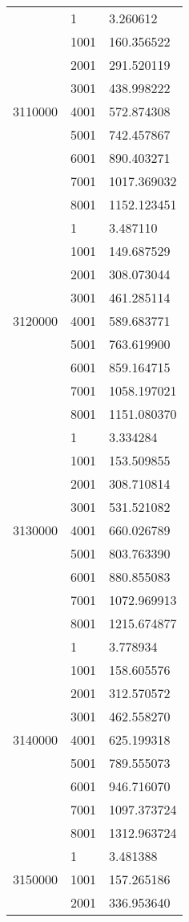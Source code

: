 \begin{table}[htb!]
\begin{tabular}{lll}
\multirow[c]{9}{*}{3110000} & 1 & 3.260612 \\
 & 1001 & 160.356522 \\
 & 2001 & 291.520119 \\
 & 3001 & 438.998222 \\
 & 4001 & 572.874308 \\
 & 5001 & 742.457867 \\
 & 6001 & 890.403271 \\
 & 7001 & 1017.369032 \\
 & 8001 & 1152.123451 \\
\multirow[c]{9}{*}{3120000} & 1 & 3.487110 \\
 & 1001 & 149.687529 \\
 & 2001 & 308.073044 \\
 & 3001 & 461.285114 \\
 & 4001 & 589.683771 \\
 & 5001 & 763.619900 \\
 & 6001 & 859.164715 \\
 & 7001 & 1058.197021 \\
 & 8001 & 1151.080370 \\
\multirow[c]{9}{*}{3130000} & 1 & 3.334284 \\
 & 1001 & 153.509855 \\
 & 2001 & 308.710814 \\
 & 3001 & 531.521082 \\
 & 4001 & 660.026789 \\
 & 5001 & 803.763390 \\
 & 6001 & 880.855083 \\
 & 7001 & 1072.969913 \\
 & 8001 & 1215.674877 \\
\multirow[c]{9}{*}{3140000} & 1 & 3.778934 \\
 & 1001 & 158.605576 \\
 & 2001 & 312.570572 \\
 & 3001 & 462.558270 \\
 & 4001 & 625.199318 \\
 & 5001 & 789.555073 \\
 & 6001 & 946.716070 \\
 & 7001 & 1097.373724 \\
 & 8001 & 1312.963724 \\
\multirow[c]{9}{*}{3150000} & 1 & 3.481388 \\
 & 1001 & 157.265186 \\
 & 2001 & 336.953640 \\

\end{tabular}
\end{table}
